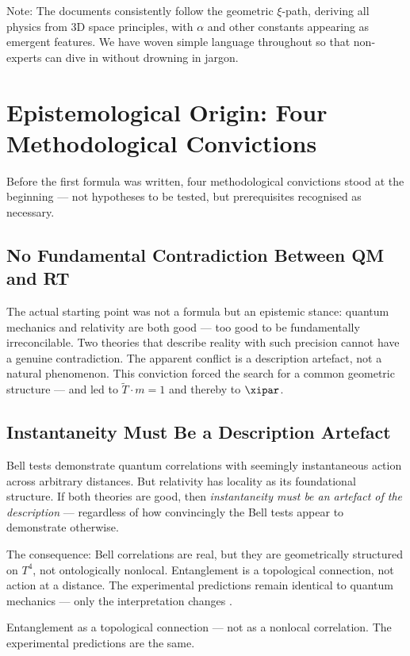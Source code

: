 	Note: The documents consistently follow the geometric $\xi$-path, deriving all physics from 3D space principles, with $\alpha$ and other constants appearing as emergent features. We have woven simple language throughout so that non-experts can dive in without drowning in jargon.
	
	\section{Epistemological Origin: Four Methodological Convictions}

Before the first formula was written, four methodological convictions stood at the beginning --- not hypotheses to be tested, but prerequisites recognised as necessary.

\subsection{No Fundamental Contradiction Between QM and RT}

The actual starting point was not a formula but an epistemic stance: quantum mechanics and relativity are both good --- too good to be fundamentally irreconcilable. Two theories that describe reality with such precision cannot have a genuine contradiction. The apparent conflict is a description artefact, not a natural phenomenon. This conviction forced the search for a common geometric structure --- and led to $\tilde{T} \cdot m = 1$ and thereby to $\xipar$.

\subsection{Instantaneity Must Be a Description Artefact}

Bell tests demonstrate quantum correlations with seemingly instantaneous action across arbitrary distances. But relativity has locality as its foundational structure. If both theories are good, then \emph{instantaneity must be an artefact of the description} --- regardless of how convincingly the Bell tests appear to demonstrate otherwise.

The consequence: Bell correlations are real, but they are geometrically structured on $T^4$, not ontologically nonlocal. Entanglement is a topological connection, not action at a distance. The experimental predictions remain identical to quantum mechanics --- only the interpretation changes \cite{Hilbertraum2026}.

\begin{keyresult}
Entanglement as a topological connection --- not as a nonlocal correlation. The experimental predictions are the same.
\end{keyresult}

